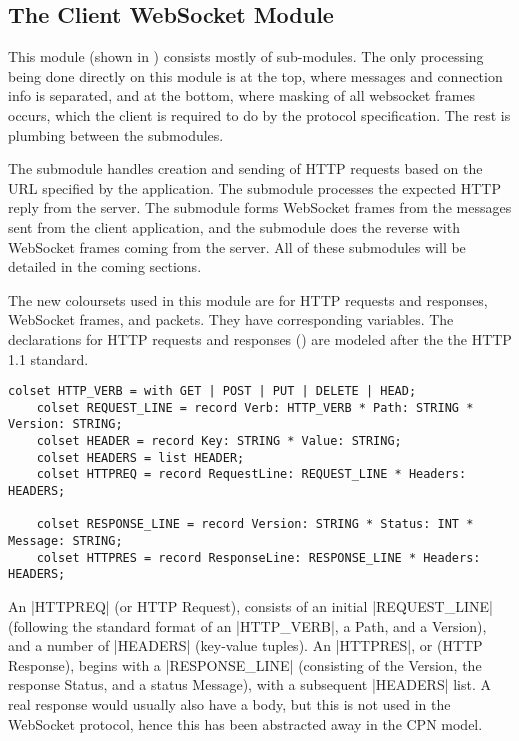 \subsection{The Client WebSocket Module}


	This module (shown in ) consists mostly of sub-modules.
	The only processing being done directly on this module is at the top, where messages and
	connection info is separated, and at the bottom, where
	masking of all websocket frames occurs, which the client is required to do by
	the protocol specification. The rest is plumbing between the submodules. 
	
	The  submodule handles creation and sending of
	HTTP requests based on the URL specified by the application. The 
	 submodule processes the expected HTTP reply from
	the server. The  submodule forms WebSocket frames from
	the messages sent from the client application, and the  submodule does the reverse with WebSocket frames coming from the
	server. All of these submodules will be detailed in the coming sections.
	
	The new coloursets used in this module are for HTTP requests and responses,
	WebSocket frames, and packets. They have corresponding variables. The
	declarations for HTTP requests and responses ()
	are modeled after the  the HTTP 1.1 standard.
	
	\begin{lstlisting}[label=lst:client_lib_colset_http,caption=HTTP colour
	sets,gobble=1,float=h]
	colset HTTP_VERB = with GET | POST | PUT | DELETE | HEAD;
	colset REQUEST_LINE = record Verb: HTTP_VERB * Path: STRING * Version: STRING;
	colset HEADER = record Key: STRING * Value: STRING;
	colset HEADERS = list HEADER;
	colset HTTPREQ = record RequestLine: REQUEST_LINE *	Headers: HEADERS;
	
	colset RESPONSE_LINE = record Version: STRING * Status: INT * Message: STRING;
	colset HTTPRES = record ResponseLine: RESPONSE_LINE * Headers: HEADERS;
	\end{lstlisting}
	 
	An |HTTPREQ| (or HTTP Request),	consists of an initial |REQUEST_LINE|
	(following the standard format of an |HTTP_VERB|, a Path, and a Version), and
	a number of |HEADERS| (key-value tuples). An |HTTPRES|, or (HTTP Response),
	begins with a |RESPONSE_LINE| (consisting of the Version, the response
	Status, and a status Message), with a subsequent |HEADERS| list. A real
	response would usually also have a body, but this is not used in the
	WebSocket protocol, hence this has been abstracted away in the CPN model.
	
